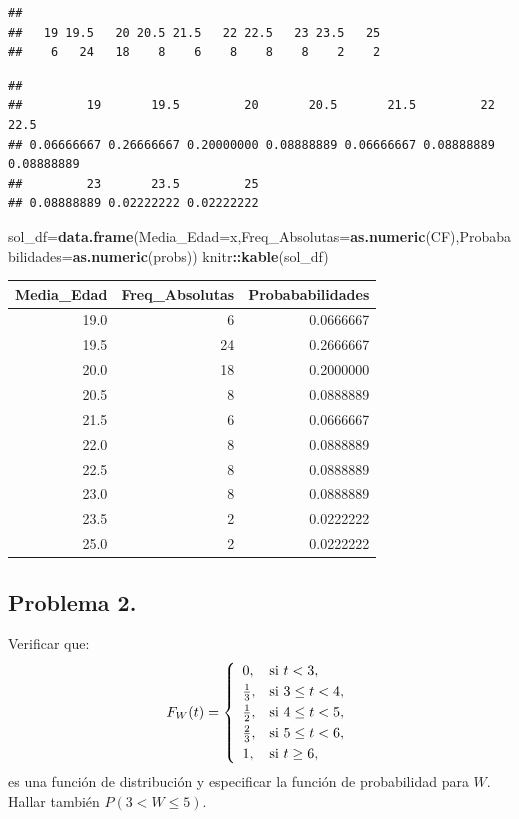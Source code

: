 \documentclass[]{article}
\newenvironment{Shaded}{\begin{snugshade}}{\end{snugshade}}
\newcommand{\DataTypeTok}[1]{\textcolor[rgb]{0.13,0.29,0.53}{#1}}
\newcommand{\KeywordTok}[1]{\textcolor[rgb]{0.13,0.29,0.53}{\textbf{#1}}}
\newcommand{\NormalTok}[1]{#1}
\newcommand{\OperatorTok}[1]{\textcolor[rgb]{0.81,0.36,0.00}{\textbf{#1}}}
\begin{document}
\begin{verbatim}
## 
##   19 19.5   20 20.5 21.5   22 22.5   23 23.5   25 
##    6   24   18    8    6    8    8    8    2    2
\end{verbatim}

\begin{Shaded}
\end{Shaded}

\begin{verbatim}
## 
##         19       19.5         20       20.5       21.5         22       22.5 
## 0.06666667 0.26666667 0.20000000 0.08888889 0.06666667 0.08888889 0.08888889 
##         23       23.5         25 
## 0.08888889 0.02222222 0.02222222
\end{verbatim}

\begin{Shaded}
\begin{Highlighting}[]
\NormalTok{sol_df=}\KeywordTok{data.frame}\NormalTok{(}\DataTypeTok{Media_Edad=}\NormalTok{x,}\DataTypeTok{Freq_Absolutas=}\KeywordTok{as.numeric}\NormalTok{(CF),}\DataTypeTok{Probababilidades=}\KeywordTok{as.numeric}\NormalTok{(probs))}
\NormalTok{knitr}\OperatorTok{::}\KeywordTok{kable}\NormalTok{(sol_df)}
\end{Highlighting}
\end{Shaded}

\begin{longtable}[]{@{}rrr@{}}
\toprule
Media\_Edad & Freq\_Absolutas & Probababilidades\tabularnewline
\midrule
\endhead
19.0 & 6 & 0.0666667\tabularnewline
19.5 & 24 & 0.2666667\tabularnewline
20.0 & 18 & 0.2000000\tabularnewline
20.5 & 8 & 0.0888889\tabularnewline
21.5 & 6 & 0.0666667\tabularnewline
22.0 & 8 & 0.0888889\tabularnewline
22.5 & 8 & 0.0888889\tabularnewline
23.0 & 8 & 0.0888889\tabularnewline
23.5 & 2 & 0.0222222\tabularnewline
25.0 & 2 & 0.0222222\tabularnewline
\bottomrule
\end{longtable}

\hypertarget{problema-2.}{%
\subsection{Problema 2.}\label{problema-2.}}

Verificar que: \[F_W (t)=
\left\{\begin{array}{ll}
0, & \mbox{si $t<3$},
 \\[0.1cm]
{1\over 3}, & \mbox{si $3\leq t<4$},
 \\[0.1cm]
{1\over 2}, & \mbox{si $4\leq t<5$},
 \\[0.1cm] 
{2\over 3}, & \mbox{si $5\leq t<6$},
 \\[0.1cm] 
1, & \mbox{si $t\geq 6$},
\end{array}\right.
\] es una función de distribución y especificar la función de
probabilidad para \(W\). Hallar también \(P(3<W\leq 5)\).
\end{document}

